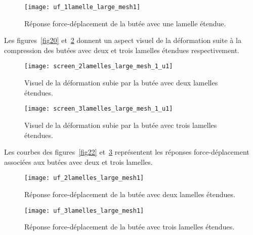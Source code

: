 ﻿\documentclass{article}
\newcommand{\cimg}{0.8}
\begin{document}
\begin{figure}[!h]
	\centering
	\texttt{[image: uf\_1lamelle\_large\_mesh1]}
	\caption{Réponse force-déplacement de la butée avec une lamelle étendue.}
	\label{fig19}
\end{figure}

Les figures~\ref{fig20} et~\ref{fig21} donnent un aspect visuel de la déformation suite à la compression des butées avec deux et trois lamelles étendues respectivement.

\begin{figure}[htbp]
	\begin{minipage}[c]{.45\linewidth}
	\begin{center}
	\texttt{[image: screen\_2lamelles\_large\_mesh\_1\_u1]}
	\caption{Visuel de la déformation subie par la butée avec deux lamelles étendues.}
	\label{fig20}
	\end{center}
	\end{minipage}
	\hfill
	\begin{minipage}[c]{.45\linewidth}
	\begin{center}
	\texttt{[image: screen\_3lamelles\_large\_mesh\_1\_u1]}
	\caption{Visuel de la déformation subie par la butée avec trois lamelles étendues.}
	\label{fig21}
	\end{center}
	\end{minipage}
\end{figure}

Les courbes des figures~\ref{fig22} et~\ref{fig23} représentent les réponses force-déplacement associées aux butées avec deux et trois lamelles.

\begin{figure}[htbp]
	\begin{minipage}[c]{.45\linewidth}
	\begin{center}
	\texttt{[image: uf\_2lamelles\_large\_mesh1]}
	\caption{Réponse force-déplacement de la butée avec deux lamelles étendues.}
	\label{fig22}
	\end{center}
	\end{minipage}
	\hfill
	\begin{minipage}[c]{.45\linewidth}
	\begin{center}
	\texttt{[image: uf\_3lamelles\_large\_mesh1]}
	\caption{Réponse force-déplacement de la butée avec trois lamelles étendues.}
	\label{fig23}
	\end{center}
	\end{minipage}
\end{figure}
\end{document}
